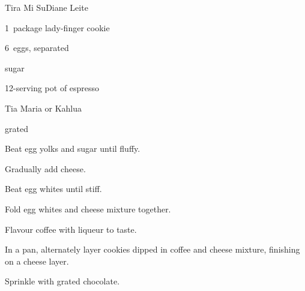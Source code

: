 \begin{recipe}{Tira Mi Su}{Diane Leite}{}

\begin{ingredients}
\item 1~package lady-finger cookie
\item {} 
\item 6~eggs, separated
\item \C{\threequarter} sugar
\item 12-serving pot of espresso
\item Tia Maria or Kahlua
\item grated 
\end{ingredients}

\begin{directions}
\item Beat egg yolks and sugar until fluffy.
\item Gradually add cheese.
\item Beat egg whites until stiff.
\item Fold egg whites and cheese mixture together.
\item Flavour coffee with liqueur to taste.
\item In a pan, alternately layer cookies dipped in coffee and cheese mixture, finishing on a cheese layer.
\item Sprinkle with grated chocolate.
\end{directions}

\end{recipe}
